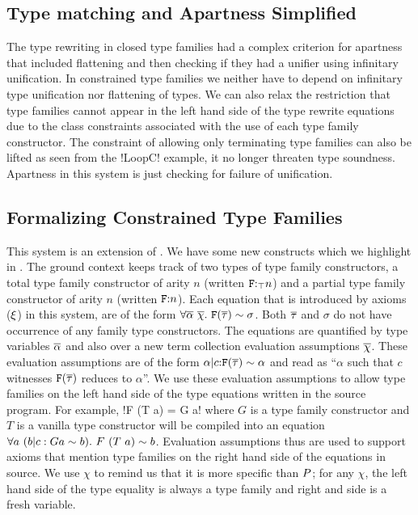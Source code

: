 \documentclass[format=acmsmall,manuscript,review,screen,nonacm,margin=1in,11pt]{acmart}
\begin{document}
\subsection{Type matching and Apartness Simplified}
The type rewriting in closed type families had a complex criterion for apartness that included
flattening and then checking if they had a unifier using infinitary unification. In constrained type families
we neither have to depend on infinitary type unification nor flattening of types. We can
also relax the restriction that type families cannot appear in the left hand side
of the type rewrite equations due to the class constraints associated with
the use of each type family constructor. The constraint of allowing only terminating
type families can also be lifted as seen from the !LoopC! example, it no longer
threaten type soundness. Apartness in this system is just checking for failure of unification.

\subsection{Formalizing Constrained Type Families}\label{subsec:tf-constrained-formal}
This system is an extension of \CLTF. We have some new constructs which
we highlight in . The ground context keeps track of
two types of type family constructors, a total type family constructor of arity $n$ (written $\texttt{F}{:}_\top n$)
and a partial type family constructor of arity $n$ (written $\texttt{F}{:} n$). Each equation that is introduced
by axioms ($\xi$) in this system, are of the form $\forall\overline{\alpha}~\overline{\chi}.~\texttt{F}(\overline{\tau})\mathrel{\sim}\sigma$.
Both $\overline{\tau}$ and $\sigma$ do not have occurrence of any family type constructors. 
The equations are quantified by type variables $\overline{\alpha}$
and also over a new term collection evaluation assumptions $\overline{\chi}$.
These evaluation assumptions are of the form $\alpha|c{:}\texttt{F}(\overline{\tau})\mathrel{\sim}\alpha$ and read as
``$\alpha$ such that $c$ witnesses $\texttt{F}(\overline{\tau})$ reduces to $\alpha$''. We use these evaluation assumptions
to allow type families on the left hand side of the type equations written in the source program. For example,
!F (T a) = G a! where $G$ is a type family constructor and $T$ is a vanilla type constructor will
be compiled into an equation $\forall a~(b|c:G a \mathrel{\sim} b).~ F~(T~a) \mathrel{\sim} b$. Evaluation assumptions thus
are used to support axioms that mention type families on the right hand side of the equations in source.
We use $\chi$ to remind us that it is more specific than $P$; for any $\chi$,
the left hand side of the type equality is always a type family and right and side is a fresh variable.
\end{document}
